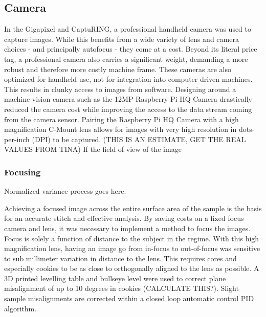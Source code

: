 \documentclass[a4paper,12pt]{article}
\begin{document}
\subsection{Camera}
In the Gigapixel and CaptuRING, a professional handheld camera was used to capture images. 
While this benefits from a wide variety of lens and camera choices - and principally autofocus - they come at a cost. 
Beyond its literal price tag, a professional camera also carries a significant weight, demanding a more robust and therefore more costly machine frame. 
These cameras are also optimized for handheld use, not for integration into computer driven machines. 
This results in clunky access to images from software. 
Designing around a machine vision camera such as the 12MP Raspberry Pi HQ Camera drastically reduced the camera cost while improving the access to the data stream coming from the camera sensor.
Pairing the Raspberry Pi HQ Camera with a high magnification C-Mount lens allows for images with very high resolution in dots-per-inch (DPI) to be captured. (THIS IS AN ESTIMATE, GET THE REAL VALUES FROM TINA) If the field of view of the image

\subsubsection{Focusing}
Normalized variance process goes here.

Achieving a focused image across the entire surface area of the sample is the basis for an accurate stitch and effective analysis. 
By saving costs on a fixed focus camera and lens, it was necessary to implement a method to focus the images. 
Focus is solely a function of distance to the subject in the regime. 
With this high magnification lens, having an image go from in-focus to out-of-focus was sensitive to sub millimeter variation in distance to the lens. 
This requires cores and especially cookies to be as close to orthogonally aligned to the lens as possible. 
A 3D printed levelling table and bullseye level were used to correct plane misalignment of up to 10 degrees in cookies (CALCULATE THIS?). 
Slight sample misalignments are corrected within a closed loop automatic control PID algorithm. 


\end{document}
